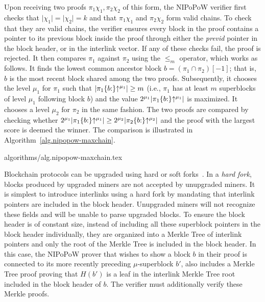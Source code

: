 Upon receiving two proofs $\pi_1\chi_1, \pi_2\chi_2$ of this form, the NIPoPoW verifier
first checks that $\lvert \chi_1 \rvert = \lvert \chi_2 \rvert = k$ and that
$\pi_1 \chi_1$ and $\pi_2 \chi_2$ form valid chains. To check that they are
valid chains, the verifier ensures every block in the
proof contains a pointer to its previous block inside the proof through either
the \emph{previd} pointer in the block header, or in the interlink vector. If
any of these checks fail, the proof is rejected. It then
compares $\pi_1$ against $\pi_2$ using
the $\leq_m$ operator, which works as follows. It finds the
lowest common ancestor block $b = (\pi_1 \cap \pi_2)[-1]$; that is, $b$ is the
most recent block shared among the two proofs. Subsequently, it
chooses the level $\mu_1$ for $\pi_1$ such that
$\lvert \pi_1\{b{:}\}\negthickspace\uparrow^{\mu_1} \rvert \geq m$
(i.e., $\pi_1$ has at least $m$ superblocks of level $\mu_1$ following block
$b$) and the value
$2^{\mu_1} \lvert \pi_1\{b{:}\}\negthickspace\uparrow^{\mu_1} \rvert$
is maximized.
It chooses a level $\mu_2$ for $\pi_2$ in the same fashion. The two proofs are
compared
by checking whether
$2^{\mu_1} \lvert \pi_1\{b{:}\}\negthickspace\uparrow^{\mu_1} \rvert \geq
 2^{\mu_2} \lvert \pi_2\{b{:}\}\negthickspace\uparrow^{\mu_2} \rvert$
and the proof with the largest score is deemed the winner. The comparison is
illustrated in Algorithm~\ref{alg.nipopow-maxchain}.

{algorithms/alg.nipopow-maxchain.tex}

Blockchain protocols can be upgraded using hard or soft
forks~\cite{buterinforks}. In a \emph{hard fork}, blocks produced by
upgraded miners are not accepted by unupgraded miners. It is simplest to
introduce interlinks using a hard fork by mandating that interlink pointers are
included in the block header. Unupgraded miners will not
recognize these fields and will be unable to parse upgraded blocks.
To ensure the block header is of constant size, instead of including all these
superblock pointers in the block header individually, they are organized into a
Merkle Tree of interlink pointers and only the root of the Merkle Tree is
included in the block header. In this case, the NIPoPoW prover that wishes to
show a block $b$ in their proof is connected to its more recently preceding
$\mu$-superblock $b'$, also includes a Merkle Tree proof proving that $H(b')$ is
a leaf in the interlink Merkle Tree root included in the block header of $b$.
The verifier must additionally verify these Merkle proofs.

